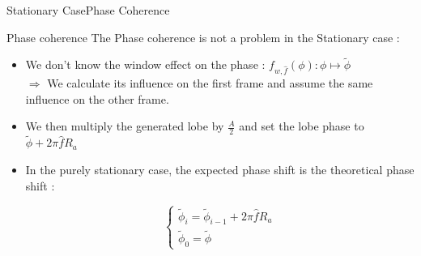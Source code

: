 \documentclass{bredelebeamer}
\begin{document}
\begin{frame}{Stationary Case}{Phase Coherence}

\begin{block}{Phase coherence}
The Phase coherence is not a problem in the Stationary case :
\begin{itemize}
\item We don't know the window effect on the phase : ${f_{w, \hat{f}}(\phi) : \phi \mapsto \tilde{\phi}}$  \\
$ \Rightarrow$ We calculate its influence on the first frame and assume the same influence on the other frame.

\item We then multiply the generated lobe by $\frac{A}{2}$ and set the lobe phase to $\tilde{\phi} + 2\pi \hat{f} R_a$   
\item In the purely stationary case, the expected phase shift is the theoretical phase shift :

\begin{equation}
\begin{cases}
\tilde{\phi}_i = \tilde{\phi}_{i-1} + 2\pi \hat{f} R_a \\
\tilde{\phi}_0 = \tilde{\phi}
\end{cases}
\end{equation}

\end{itemize}
\end{block}


\end{frame}
\end{document}
